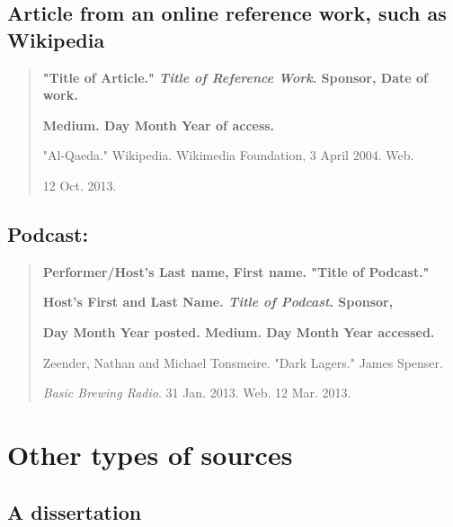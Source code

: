 
\subsection{Article from an online reference work, such as Wikipedia}
\begin{quote}

\textbf{"Title of Article." \emph{Title of Reference Work}. Sponsor, Date of work.} 

\hspace{.4in}\textbf{Medium. Day Month Year of access.}

\medskip

"Al-Qaeda." Wikipedia. Wikimedia Foundation, 3 April 2004. Web. 

\hspace{.4in}12 Oct. 2013.

\end{quote}

\subsection{Podcast:}

\begin{quote}
\textbf{Performer/Host's Last name, First name. "Title of Podcast."} 

\hspace{.4in}\textbf{Host's First and Last Name. \emph{Title of Podcast}. Sponsor,}

\hspace{.4in}\textbf{Day Month Year posted. Medium. Day Month Year accessed.}

\medskip

Zeender, Nathan and Michael Tonsmeire. "Dark Lagers." James Spenser. 

\hspace{.4in}\emph{Basic Brewing Radio}. 31 Jan. 2013. Web. 12 Mar. 2013.

\end{quote}


\section{Other types of sources}

\subsection{A dissertation}

